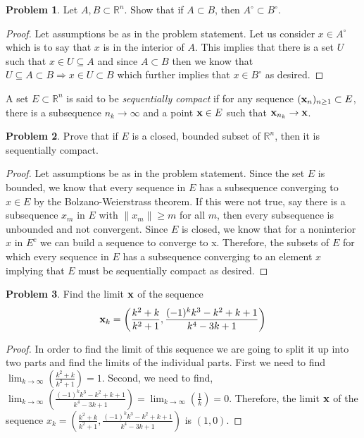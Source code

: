 \documentclass[11pt]{article}
\theoremstyle{definition}
\newtheorem{problem}{Problem}
\newcommand{\R}{\mathbb{R}}
\newcommand{\bx}{{\bf x}}
\begin{document}
\pagebreak
\begin{problem}
Let $A, B \subset \R^n$. Show that if $A \subset B$, then $A^\circ \subset B^\circ$. 
\end{problem}

\begin{proof}
Let assumptions be as in the problem statement. Let us consider $x \in A^\circ$ which is to say that $x$ is in the interior of $A$. This implies that there is a set $U$ such that $x\in U \subseteq A$ and since $A \subset B$ then we know that $U\subseteq A \subset B \Rightarrow x\in U\subset B$ which further implies that $x\in B^\circ$ as desired.
\end{proof}

\pagebreak
A set $E \subset \R^n$ is said to be \emph{sequentially compact} if 
for any sequence $(\bx_n)_{n \geq 1} \subset E$, there is a subsequence $n_k \to \infty$ and a point $\bx \in E$ such that $\bx_{n_k} \to \bx$. 
\begin{problem}
Prove that if $E$ is a closed, bounded subset of $\R^n$, then it is sequentially compact. 
\end{problem}

\begin{proof}
Let assumptions be as in the problem statement. Since the set $E$ is bounded, we know that every sequence in $E$ has a subsequence converging to $x\in E$ by the Bolzano-Weierstrass theorem. If this were not true, say there is a subsequence $x_m$ in $E$ with $\|x_m\| \geq m$ for all $m$, then every subsequence is unbounded and not convergent. Since $E$ is closed, we know that for a noninterior $x$ in $E^c$ we can build a sequence to converge to x. Therefore, the subsets of $E$ for which every sequence in $E$ has a subsequence converging to an element $x$ implying that $E$ must be sequentially compact as desired.
\end{proof}

\pagebreak
\begin{problem}
Find the limit $\bx$ of the sequence
\[
\bx_k = \left( \frac{k^2 + k}{k^2 + 1} , \frac{(-1)^k k^3 - k^2 + k + 1}{k^4 - 3 k + 1}\right) 
\]
\end{problem}

\begin{proof}
In order to find the limit of this sequence we are going to split it up into two parts and find the limits of the individual parts. First we need to find $\lim_{k\to\infty}(\frac{k^2+k}{k^2+1}) = 1$. Second, we need to find, $\lim_{k\to\infty}(\frac{(-1)^kk^3-k^2+k+1}{k^4-3k+1}) = \lim_{k\to\infty}(\frac{1}{k}) = 0.$ Therefore, the limit $\bx$ of the sequence $x_k = (\frac{k^2 + k}{k^2 + 1} , \frac{(-1)^k k^3 - k^2 + k + 1}{k^4 - 3 k + 1})$ is $(1, 0).$
\end{proof}
\end{document}
